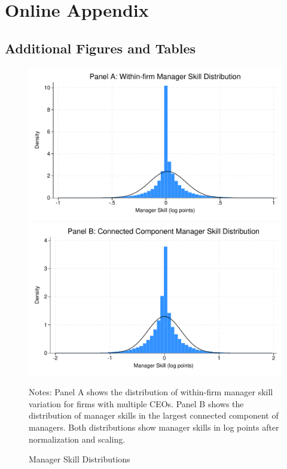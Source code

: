 \documentclass[11pt,a4paper]{article}
\begin{document}



\appendix
\section{Online Appendix}
\subsection{Additional Figures and Tables}
\renewcommand{\thefigure}{A\arabic{figure}}
\renewcommand{\thetable}{A\arabic{table}}



\begin{figure}[htbp]
\centering
\begin{minipage}{0.48\textwidth}
\centering
\includegraphics[width=\textwidth]{figure/manager_skill_within.pdf}
\end{minipage}
\hfill
\begin{minipage}{0.48\textwidth}
\centering
\includegraphics[width=\textwidth]{figure/manager_skill_connected.pdf}
\end{minipage}
\caption{Manager Skill Distributions}
\label{fig:manager_skills_appendix}
\footnotesize
Notes: Panel A shows the distribution of within-firm manager skill variation for firms with multiple CEOs. Panel B shows the distribution of manager skills in the largest connected component of managers. Both distributions show manager skills in log points after normalization and scaling.
\end{figure}
\end{document}
